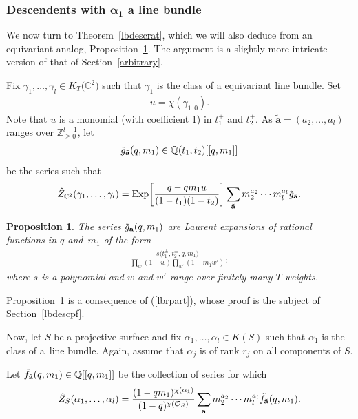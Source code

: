 \documentclass[pdftex]{sigma}
\newtheorem{Proposition}[Theorem]{Proposition}
 { \theoremstyle{definition}
\newtheorem{Definition}[Theorem]{Definition}
\newtheorem{Note}[Theorem]{Note}
\newtheorem{Example}[Theorem]{Example}
\newtheorem{Remark}[Theorem]{Remark} }
\numberwithin{equation}{section}
\newcommand{\Exp}{\mathrm{Exp}}
\def\C{\mathbb C}
\def\Q{\mathbb Q}
\def\Z{\mathbb Z}
\begin{document}
\subsubsection[Descendents with alpha\_1 a line bundle]{Descendents with $\boldsymbol{\alpha_1}$ a line bundle}

We now turn to Theorem~\ref{lbdescrat}, which we will also deduce from an equivariant analog, Proposition~\ref{lbequivdesc}. The argument is a slightly more intricate version of that of Section~\ref{arbitrary}.

Fix $\gamma_1,\dots,\gamma_l\in K_T\big(\C^2\big)$ such that $\gamma_1$ is the class of a equivariant line bundle. Set
\begin{gather*}
u=\chi(\gamma_1|_0).
\end{gather*}
Note that $u$ is a monomial (with coefficient 1) in $t_1^{\pm}$ and $t_2^{\pm}$. As $\tilde{\mathbf{a}}=(a_2,\dots,a_l)$ ranges over $\Z_{\geq 0}^{l-1}$, let
\begin{gather*}
\tilde{g}_{\tilde{\bf{a}}}(q,m_1)\in \Q(t_1,t_2)[[q,m_1]]
\end{gather*}
be the series such that
\begin{align}\label{gtildedef}
\hat{Z}_{\C^2}(\gamma_1,\dots,\gamma_l)=\Exp\bigg[\frac{q-qm_1u}{(1-t_1)(1-t_2)}\bigg]
\sum_{\tilde{\bf{a}}} m_2^{a_2}\cdots m_l^{a_l}\tilde{g}_{\tilde{\bf{a}}}.
\end{align}

\begin{Proposition}\label{lbequivdesc}
The series $\tilde{g}_{\tilde{\bf a}}(q,m_1)$ are Laurent expansions of rational functions in $q$ and~$m_1$ of the form
\begin{gather*}
\frac{s\big(t_1^{\pm}, t_2^{\pm},q,m_1\big)}{\prod_{w}(1-w)\prod_{w'}(1-m_1w')},
\end{gather*}
where $s$ is a polynomial and $w$ and $w'$ range over finitely many $T$-weights.
\end{Proposition}

Proposition~\ref{lbequivdesc} is a consequence of (\ref{lbrpart}), whose proof is the subject of Section~\ref{lbdescpf}.

Now, let $S$ be a projective surface and fix $\alpha_1,\dots,\alpha_l\in K(S)$ such that $\alpha_1$ is the class of a~line bundle. Again, assume that $\alpha_j$ is of rank $r_j$ on all components of $S$.

Let $\tilde{f}_{\tilde{\bf{a}}}(q,m_1)\in \Q[[q,m_1]]$ be the collection of series for which
\begin{gather*}
\hat{Z}_S(\alpha_1,\dots,\alpha_l)=\frac{(1-qm_1)^{\chi(\alpha_1)}} {(1-q)^{\chi(\mathcal{O}_S)}}\sum_{\tilde{\bf{a}}} m_2^{a_2}\cdots m_l^{a_l}\tilde{f}_{\tilde{\bf{a}}}(q,m_1).
\end{gather*}
\end{document}

